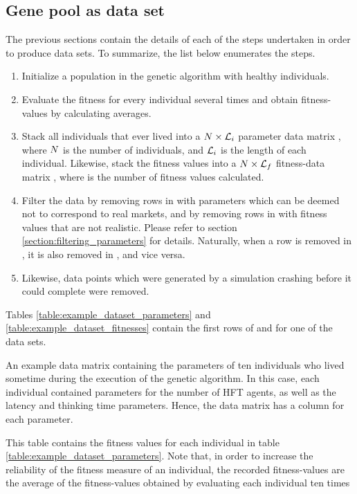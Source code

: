 \subsection{Gene pool as data set}\label{section:gene_pool_as_data_set}
The previous sections contain the details of each of the steps undertaken in order to produce data sets. To summarize, the list below enumerates the steps.
\begin{enumerate}
\item Initialize a population in the genetic algorithm with healthy individuals.
\item Evaluate the fitness for every individual several times and obtain fitness-values by calculating averages.
\item Stack all individuals that ever lived into a $N \times \mathcal{L}_i$ parameter data matrix \datamatrixpar, where $N$ is the number of individuals, and $\mathcal{L}_i$ is the length of each individual. Likewise, stack the fitness values into a $N \times \mathcal{L}_f$ fitness-data matrix \datamatrixfit, where \fitnesslength is the number of fitness values calculated. 
\item Filter the data by removing rows in \datamatrixpar with parameters which can be deemed not to correspond to real markets, and by removing rows in \datamatrixfit with fitness values that are not realistic. Please refer to section \ref{section:filtering_parameters} for details. Naturally, when a row is removed in \datamatrixpar, it is also removed in \datamatrixfit, and vice versa. 
\item Likewise, data points which were generated by a simulation crashing before it could complete were removed.
\end{enumerate}
Tables \ref{table:example_dataset_parameters} and \ref{table:example_dataset_fitnesses} contain the first rows of \datamatrixpar and \datamatrixfit for one of the data sets.
\begin{table}
\centering
\scriptsize

\caption{An example data matrix containing the parameters of ten individuals who lived sometime during the execution of the genetic algorithm. In this case, each individual contained parameters for the number of HFT agents, as well as the latency and thinking time parameters. Hence, the data matrix has a column for each parameter.}
\label{table:example_dataset_parameters}
\end{table}

\begin{table}
\centering

\caption{This table contains the fitness values for each individual in table \ref{table:example_dataset_parameters}. Note that, in order to increase the reliability of the fitness measure of an individual, the recorded fitness-values are the average of the fitness-values obtained by evaluating each individual ten times}
\label{table:example_dataset_fitnesses}
\end{table}

